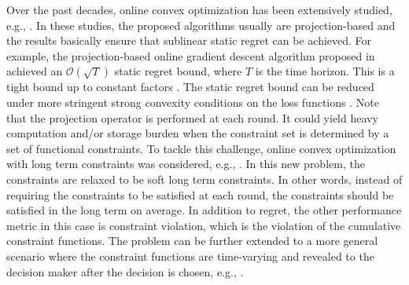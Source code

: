 \documentclass[12pt,draftcls,onecolumn]{IEEEtran}%
\begin{document}
Over the past decades, online convex optimization has been extensively studied, e.g.,
\cite{zinkevich2003online,hazan2007logarithmic,agarwal2010optimal,shalev2012online,yi2016tracking,mokhtari2016online,hazan2016introduction,shamir2017optimal,zhang2018adaptive,zhang2018dynamic,shames2019online,
	ijcai2020-731}. %
In these studies, the proposed algorithms usually are   projection-based and the results basically ensure that sublinear static regret can be achieved. For example, the projection-based online gradient descent algorithm proposed in \cite{zinkevich2003online} achieved an $\mathcal{O}(\sqrt{T})$ static regret bound, where $T$ is the time horizon. This is a tight bound up to constant factors \cite{hazan2007logarithmic}. The static regret bound can be reduced under more stringent strong convexity conditions on the loss functions \cite{hazan2007logarithmic,shalev2012online,mokhtari2016online,hazan2016introduction}. Note that the projection operator is performed at each round. It could yield heavy computation and/or storage burden when the constraint set is determined by a set of functional constraints. To tackle this challenge, online convex optimization with long term constraints was considered, e.g., \cite{mahdavi2012trading,jenatton2016adaptive,NIPS2018_7852,yu2020lowJMLR,yi2021regret}. In this new problem, the constraints are relaxed to be soft long term constraints. In other words, instead of requiring the constraints to be satisfied at each round, the constraints  should be satisfied in the long term on average. In addition to regret, the other performance metric in this case is constraint violation, which is the violation of the cumulative constraint functions. The problem can be further extended to a more general scenario where the constraint functions are time-varying and revealed to the decision maker after the decision is chosen, e.g.,  \cite{paternain2016online,sun2017safety,yu2017online,neely2017online,chen2017online,
	chen2018bandit,chen2018heterogeneous,cao2019online,pmlr-v97-liakopoulos19a,sadeghi2019online,wei2020online}.
\end{document}
